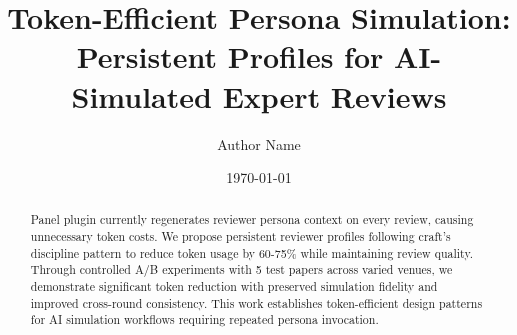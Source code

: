 \documentclass{article}
\title{Token-Efficient Persona Simulation: Persistent Profiles for AI-Simulated Expert Reviews}
\author{Author Name}
\date{\today}
\begin{document}
\maketitle

\begin{abstract}
Panel plugin currently regenerates reviewer persona context on every review, causing unnecessary token costs. We propose persistent reviewer profiles following craft's discipline pattern to reduce token usage by 60-75\% while maintaining review quality. Through controlled A/B experiments with 5 test papers across varied venues, we demonstrate significant token reduction with preserved simulation fidelity and improved cross-round consistency. This work establishes token-efficient design patterns for AI simulation workflows requiring repeated persona invocation.
\end{abstract}










\end{document}
